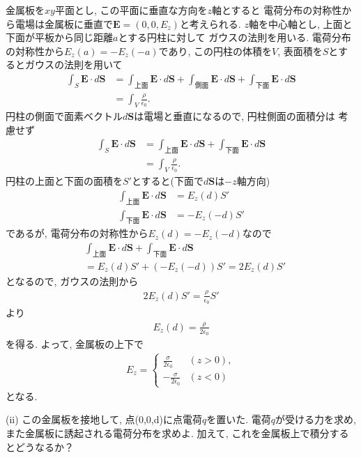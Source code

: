 \documentclass[a4paper,12pt]{jlreq}
\begin{document}
金属板を$xy$平面とし, この平面に垂直な方向を$z$軸とすると
電荷分布の対称性から電場は金属板に垂直で$\bm{E} = (0,0,E_z)$と考えられる.
$z$軸を中心軸とし, 上面と下面が平板から同じ距離$a$とする円柱に対して
ガウスの法則を用いる. 電荷分布の対称性から$E_z(a) = -E_z(-a)$であり, 
この円柱の体積を$V$, 表面積を$S$とするとガウスの法則を用いて
\begin{align}
  \int_{S}^{} \bm{E} \cdot d\bm{S} &= \int_{上面}^{} \bm{E} \cdot d\bm{S} + \int_{側面}^{} \bm{E} \cdot d\bm{S} + \int_{下面}^{} \bm{E} \cdot d\bm{S}\\
  &= \int_{V}^{} \frac{\rho}{\epsilon_0}.
\end{align}
円柱の側面で面素ベクトル$d\bm{S}$は電場と垂直になるので, 円柱側面の面積分は
考慮せず
\begin{align}
  \int_{S}^{} \bm{E} \cdot d\bm{S} &= \int_{上面}^{} \bm{E} \cdot d\bm{S} +  \int_{下面}^{} \bm{E} \cdot d\bm{S}\\
  &= \int_{V}^{} \frac{\rho}{\epsilon_0}.
\end{align}
円柱の上面と下面の面積を$S'$とすると(下面で$d\bm{S}$は$-z$軸方向)
\begin{align}
  \int_{上面}^{} \bm{E} \cdot d\bm{S} &= E_z (d)S'\\
  \int_{下面}^{} \bm{E} \cdot d\bm{S} &= -E_z (-d)S'
\end{align}
であるが, 電荷分布の対称性から$E_z(d) = -E_z(-d)$なので
\begin{align}
  &\int_{上面}^{} \bm{E} \cdot d\bm{S} +  \int_{下面}^{} \bm{E} \cdot d\bm{S}\\
  &= E_z (d)S' + (-E_z (-d))S' = 2E_z (d) S'
\end{align}
となるので, ガウスの法則から
\begin{align}
  2E_z (d) S' = \frac{\rho}{\epsilon_0}S'
\end{align}
より
\begin{align}
  E_z (d) = \frac{\rho}{2\epsilon_0}
\end{align}
を得る. よって, 金属板の上下で
\begin{align}
  E_z = \begin{cases}
    \frac{\sigma}{2\epsilon_0} & (z>0),\\
    -\frac{\sigma}{2\epsilon_0} & (z<0)
  \end{cases}
\end{align}
となる. 

\vspace{20mm}


\begin{itembox}[l]{(ii)}
  この金属板を接地して, 点(0,0,d)に点電荷$q$を置いた. 
  電荷$q$が受ける力を求め, また金属板に誘起される電荷分布を求めよ. 
  加えて, これを金属板上で積分するとどうなるか？
\end{itembox}
\par
\end{document}
